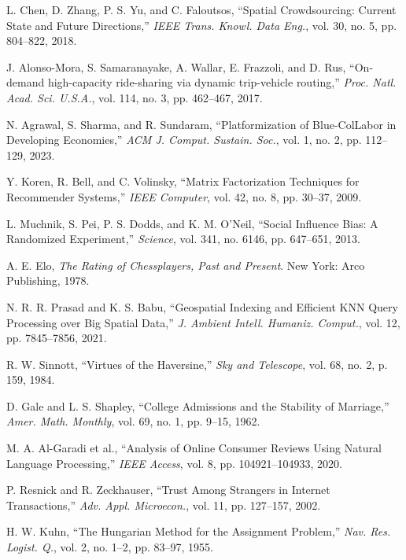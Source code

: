\documentclass[10pt,twocolumn,a4paper]{article}
\begin{document}
\vspace{0.25em}
{\footnotesize
\setlength{\parskip}{1.5pt}
\noindent [1] L. Chen, D. Zhang, P. S. Yu, and C. Faloutsos, ``Spatial Crowdsourcing: Current State and Future Directions,'' \textit{IEEE Trans. Knowl. Data Eng.}, vol. 30, no. 5, pp. 804--822, 2018.\par
\noindent [2] J. Alonso-Mora, S. Samaranayake, A. Wallar, E. Frazzoli, and D. Rus, ``On-demand high-capacity ride-sharing via dynamic trip-vehicle routing,'' \textit{Proc. Natl. Acad. Sci. U.S.A.}, vol. 114, no. 3, pp. 462--467, 2017.\par
\noindent [3] N. Agrawal, S. Sharma, and R. Sundaram, ``Platformization of Blue-ColLabor in Developing Economies,'' \textit{ACM J. Comput. Sustain. Soc.}, vol. 1, no. 2, pp. 112--129, 2023.\par
\noindent [4] Y. Koren, R. Bell, and C. Volinsky, ``Matrix Factorization Techniques for Recommender Systems,'' \textit{IEEE Computer}, vol. 42, no. 8, pp. 30--37, 2009.\par
\noindent [5] L. Muchnik, S. Pei, P. S. Dodds, and K. M. O'Neil, ``Social Influence Bias: A Randomized Experiment,'' \textit{Science}, vol. 341, no. 6146, pp. 647--651, 2013.\par
\noindent [6] A. E. Elo, \textit{The Rating of Chessplayers, Past and Present}. New York: Arco Publishing, 1978.\par
\noindent [7] N. R. R. Prasad and K. S. Babu, ``Geospatial Indexing and Efficient KNN Query Processing over Big Spatial Data,'' \textit{J. Ambient Intell. Humaniz. Comput.}, vol. 12, pp. 7845--7856, 2021.\par
\noindent [8] R. W. Sinnott, ``Virtues of the Haversine,'' \textit{Sky and Telescope}, vol. 68, no. 2, p. 159, 1984.\par
\noindent [9] D. Gale and L. S. Shapley, ``College Admissions and the Stability of Marriage,'' \textit{Amer. Math. Monthly}, vol. 69, no. 1, pp. 9--15, 1962.\par
\noindent [10] M. A. Al-Garadi et al., ``Analysis of Online Consumer Reviews Using Natural Language Processing,'' \textit{IEEE Access}, vol. 8, pp. 104921--104933, 2020.\par
\noindent [11] P. Resnick and R. Zeckhauser, ``Trust Among Strangers in Internet Transactions,'' \textit{Adv. Appl. Microecon.}, vol. 11, pp. 127--157, 2002.\par
\noindent [12] H. W. Kuhn, ``The Hungarian Method for the Assignment Problem,'' \textit{Nav. Res. Logist. Q.}, vol. 2, no. 1--2, pp. 83--97, 1955.\par
}
\end{document}
